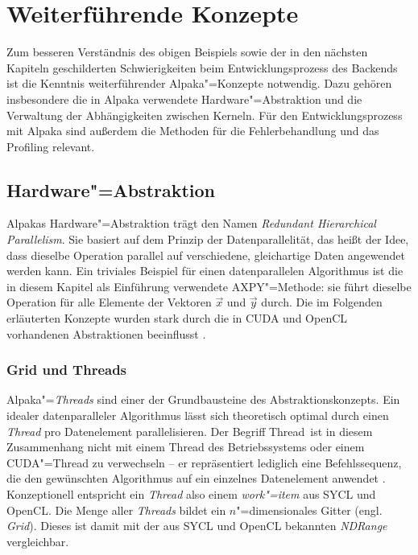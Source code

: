 \section{Weiterführende Konzepte}\label{alpaka:konzepte}

Zum besseren Verständnis des obigen Beispiels sowie der in den nächsten Kapiteln
geschilderten Schwierigkeiten beim Entwicklungsprozess des Backends ist die
Kenntnis weiterführender Alpaka"=Konzepte notwendig. Dazu gehören insbesondere
die in Alpaka verwendete Hardware"=Abstraktion und die Verwaltung der
Abhängigkeiten zwischen Kerneln. Für den Entwicklungsprozess mit Alpaka sind
außerdem die Methoden für die Fehlerbehandlung und das Profiling relevant.

\subsection{Hardware"=Abstraktion}
\label{alpaka:konzepte:abstraktion}

Alpakas Hardware"=Abstraktion trägt den Namen \textit{Redundant Hierarchical
Parallelism}\cite[vgl.][22]{worpitz2015}. Sie basiert auf dem Prinzip der
Datenparallelität, das heißt der Idee, dass dieselbe Operation parallel auf
verschiedene, gleichartige Daten angewendet werden kann. Ein triviales Beispiel
für einen datenparallelen Algorithmus ist die in diesem Kapitel als Einführung
verwendete AXPY"=Methode: sie führt dieselbe Operation für alle Elemente der
Vektoren $\vec{x}$ und $\vec{y}$ durch. Die im Folgenden erläuterten Konzepte
wurden stark durch die in CUDA und OpenCL vorhandenen Abstraktionen beeinflusst
\cite[vgl.][17]{worpitz2015}.

\subsubsection{Grid und Threads}

Alpaka"=\textit{Threads} sind einer der Grundbausteine des Abstraktionskonzepts.
Ein idealer datenparalleler Algorithmus lässt sich theoretisch optimal durch
einen \textit{Thread} pro Datenelement parallelisieren. Der Begriff
\glqq Thread\grqq\ ist in diesem Zusammenhang nicht mit einem Thread des
Betriebssystems oder einem CUDA"=Thread zu verwechseln -- er repräsentiert
lediglich eine Befehlssequenz, die den gewünschten Algorithmus auf ein einzelnes
Datenelement anwendet \cite[vgl.][17]{worpitz2015}. Konzeptionell entspricht
ein \textit{Thread} also einem \textit{work"=item} aus SYCL und OpenCL. Die
Menge aller \textit{Threads} bildet ein $n$"=dimensionales Gitter
(engl. \textit{Grid}). Dieses ist damit mit der aus SYCL und OpenCL bekannten
\textit{NDRange} vergleichbar.

